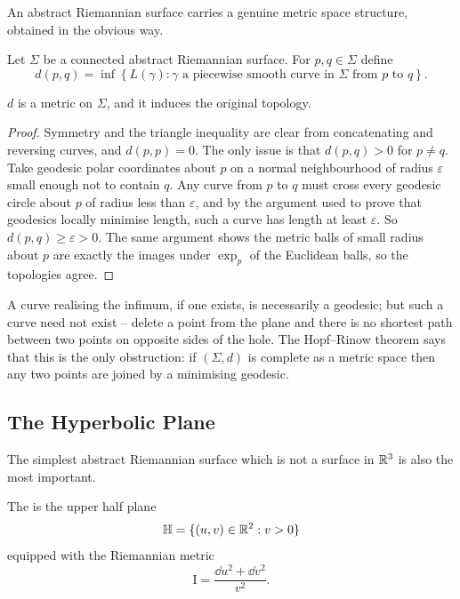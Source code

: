 \documentclass[a4paper]{scrartcl}
\newcommand{\HH}{\mathbb{H}}
\begin{document}
An abstract Riemannian surface carries a genuine metric space structure, obtained in the obvious way.

\begin{definition}
    Let $\Sigma$ be a connected abstract Riemannian surface. For $p, q \in \Sigma$ define
    $$
    d(p,q) = \inf\left\{L(\gamma) : \gamma \text{ a piecewise smooth curve in } \Sigma \text{ from } p \text{ to } q\right\}.
    $$
\end{definition}

\begin{proposition}
    $d$ is a metric on $\Sigma$, and it induces the original topology.
\end{proposition}
\begin{proof}
    Symmetry and the triangle inequality are clear from concatenating and reversing curves, and $d(p,p) = 0$. The only issue is that $d(p,q) > 0$ for $p \neq q$. Take geodesic polar coordinates about $p$ on a normal neighbourhood of radius $\varepsilon$ small enough not to contain $q$. Any curve from $p$ to $q$ must cross every geodesic circle about $p$ of radius less than $\varepsilon$, and by the argument used to prove that geodesics locally minimise length, such a curve has length at least $\varepsilon$. So $d(p,q) \geq \varepsilon > 0$. The same argument shows the metric balls of small radius about $p$ are exactly the images under $\exp_p$ of the Euclidean balls, so the topologies agree.
\end{proof}

\begin{remark}
    A curve realising the infimum, if one exists, is necessarily a geodesic; but such a curve need not exist -- delete a point from the plane and there is no shortest path between two points on opposite sides of the hole. The Hopf--Rinow theorem says that this is the only obstruction: if $(\Sigma, d)$ is complete as a metric space then any two points are joined by a minimising geodesic.
\end{remark}

\subsection{The Hyperbolic Plane}

The simplest abstract Riemannian surface which is not a surface in $\mathbb{R}^3$ is also the most important.

\begin{definition}
    The  is the upper half plane
    $$
    \HH = \{(u,v) \in \R^2 : v > 0\}
    $$
    equipped with the Riemannian metric
    $$
    \mathrm{I} = \frac{\dd u^2 + \dd v^2}{v^2}.
    $$
\end{definition}
\end{document}
